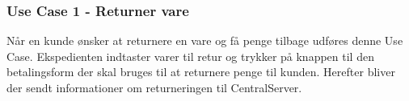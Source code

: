 \subsubsection{Use Case 1 - Returner vare}
Når en kunde ønsker at returnere en vare og få penge tilbage udføres denne Use Case. Ekspedienten indtaster varer til retur og trykker på knappen til den betalingsform der skal bruges til at returnere penge til kunden. Herefter bliver der sendt informationer om returneringen til CentralServer.